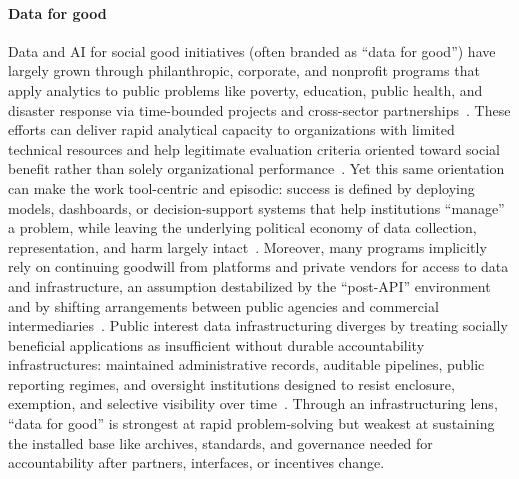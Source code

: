 \documentclass[acmsmall,screen]{acmart}
\begin{document}
\paragraph*{Data for good}
Data and AI for social good initiatives (often branded as ``data for good'') have largely grown through philanthropic, corporate, and nonprofit programs that apply analytics to public problems like poverty, education, public health, and disaster response via time-bounded projects and cross-sector partnerships~\cite{williamsDataActionUsing2022,cowlsAISocialGood2021,aulaSteppingBackData2023}. These efforts can deliver rapid analytical capacity to organizations with limited technical resources and help legitimate evaluation criteria oriented toward social benefit rather than solely organizational performance~\cite{cowlsAISocialGood2021}. Yet this same orientation can make the work tool-centric and episodic: success is defined by deploying models, dashboards, or decision-support systems that help institutions ``manage'' a problem, while leaving the underlying political economy of data collection, representation, and harm largely intact~\cite{floridiHowDesignAI2020}. Moreover, many programs implicitly rely on continuing goodwill from platforms and private vendors for access to data and infrastructure, an assumption destabilized by the ``post-API'' environment and by shifting arrangements between public agencies and commercial intermediaries~\cite{Freelon_ComputationalResearchPostAPI_2018,Bruns_APIcalypsesocialmedia_2019,taylorPublicActorsPublic2021}. Public interest data infrastructuring diverges by treating socially beneficial applications as insufficient without durable accountability infrastructures: maintained administrative records, auditable pipelines, public reporting regimes, and oversight institutions designed to resist enclosure, exemption, and selective visibility over time~\cite{schwartz_archives_2002,stoler_ColonialArchivesArts_2002,acker_DataCraftTheory_2019}. Through an infrastructuring lens, ``data for good'' is strongest at rapid problem-solving but weakest at sustaining the installed base like archives, standards, and governance needed for accountability after partners, interfaces, or incentives change.
\end{document}
